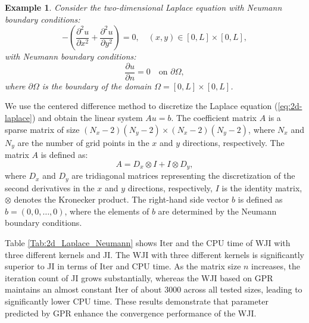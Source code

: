 \documentclass[preprint,review,sort&compress,3p]{elsarticle}
\newtheorem{exm}{Example}[section]
\begin{document}
\begin{exm}
	\label{exm:2d-laplace-neumann}
	Consider the two-dimensional Laplace equation with Neumann boundary conditions:
	\begin{equation}
		\label{eq:2d-laplace}
		-\left( \frac{\partial^2 u}{\partial x^2} + \frac{\partial^2 u}{\partial y^2} \right) = 0, \quad (x, y) \in [0, L] \times [0, L],
	\end{equation}
	with Neumann boundary conditions:
	\[
	\frac{\partial u}{\partial n} = 0 \quad \text{on } \partial \Omega,
	\]
	where \( \partial \Omega \) is the boundary of the domain \( \Omega = [0, L] \times [0, L] \).
\end{exm}

We use the centered difference method to discretize the Laplace equation (\ref{eq:2d-laplace}) and obtain the linear system \( A u = b \). The coefficient matrix \( A \) is a sparse matrix of size \( (N_x-2)(N_y-2) \times (N_x-2)(N_y-2) \), where \( N_x \) and \( N_y \) are the number of grid points in the \( x \) and \( y \) directions, respectively. The matrix \( A \) is defined as:
\[
A = D_x \otimes I + I \otimes D_y,
\]
where   \( D_x \) and \( D_y \) are tridiagonal matrices representing the discretization of the second derivatives in the \( x \) and \( y \) directions, respectively, \( I \) is the identity matrix, \( \otimes \) denotes the Kronecker product.
The right-hand side vector \( b \) is defined as $b = (0,0,\dots,0)$, where the elements of \( b \) are determined by the Neumann boundary conditions.

Table \ref{Tab:2d_Laplace_Neumann} shows Iter and the CPU time of WJI with three different kernels and JI. The WJI with three different kernels is significantly superior to JI in terms of Iter and CPU time. 
{ 
As the matrix size $n$ increases, the iteration count of JI grows substantially, whereas the WJI based on GPR maintains an almost constant Iter of about 3000 across all tested sizes, leading to significantly lower CPU time. These results demonstrate that parameter predicted by GPR  enhance the convergence performance of the WJI.
}
\end{document}
